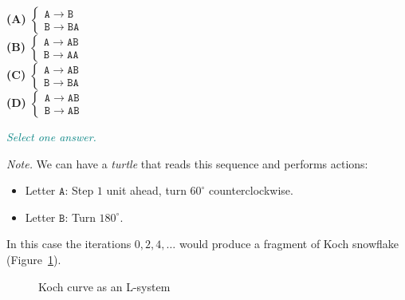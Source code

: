 \documentclass[jou]{apa6}
\begin{document}
{\bf (A)} ${\displaystyle \left\{ \begin{array}{l}
\mathtt{A} \rightarrow \mathtt{B}\\
\mathtt{B} \rightarrow \mathtt{BA}
\end{array} \right. }$\\
{\bf (B)} ${\displaystyle \left\{ \begin{array}{l}
\mathtt{A} \rightarrow \mathtt{AB}\\
\mathtt{B} \rightarrow \mathtt{AA}
\end{array} \right. }$\\
{\bf (C)} ${\displaystyle \left\{ \begin{array}{l}
\mathtt{A} \rightarrow \mathtt{AB}\\
\mathtt{B} \rightarrow \mathtt{BA}
\end{array} \right. }$\\
{\bf (D)} ${\displaystyle \left\{ \begin{array}{l}
\mathtt{A} \rightarrow \mathtt{AB}\\
\mathtt{B} \rightarrow \mathtt{AB}
\end{array} \right. }$

\textcolor{teal}{\em Select one answer.}

{\em Note.} We can have a {\em turtle} that reads this 
sequence and performs actions:
\begin{itemize}
\item Letter $\mathtt{A}$: Step $1$ unit ahead, turn 
$60^{\circ}$ counterclockwise.
\item Letter $\mathtt{B}$: Turn $180^{\circ}$. 
\end{itemize}
In this case the iterations $0,2,4,\ldots$ would produce
a fragment of Koch snowflake (Figure~\ref{fig:lindenmayer-system}).

\begin{figure}[!htb]
\caption{\label{fig:lindenmayer-system} Koch curve as an L-system}
\end{figure}
\end{document}
